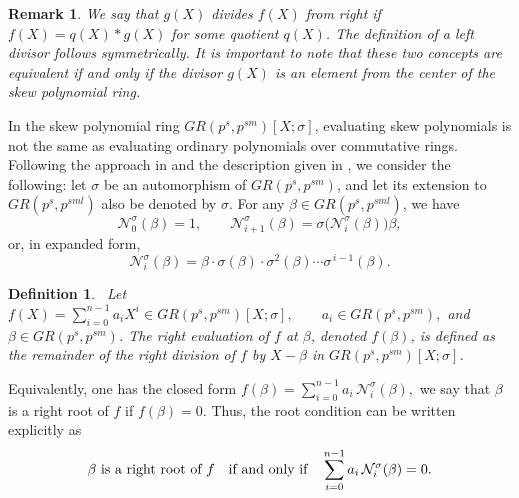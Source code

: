 \documentclass[11pt]{article}
\newtheorem{definition}{Definition}
\newtheorem{remark}{Remark}
\begin{document}
 \noindent 
 \begin{remark}
      We say that $g(X)$ divides  $f(X)$ from right if $
f(X) = q(X) \ast g(X)
$
for some quotient $q(X)$. The definition of a left divisor follows symmetrically. It is important to note that these two concepts are equivalent if and only if the divisor $g(X)$ is an element from the center of the skew polynomial ring.

 \end{remark}
 In the skew polynomial ring $GR(p^s,p^{sm})[X;\sigma]$, evaluating skew polynomials is not the same as evaluating ordinary polynomials over commutative rings. Following the approach in \cite{Bhaintwal2012Skew} and the description given in \cite[pp.~15]{Jacobson1996}, we consider the following: let $\sigma$ be an automorphism of $GR(p^s,p^{sm})$, and let its extension to $GR(p^s,p^{sml})$ also be denoted by $\sigma$.
 For any $\beta \in GR(p^s,p^{sml})$, we have
	\[
	\mathcal{N}^{\sigma}_0(\beta)=1,\qquad
	\mathcal{N}^{\sigma}_{i+1}(\beta)=\sigma\bigl(\mathcal{N}^{\sigma}_i(\beta)\bigr)\beta,
	\]
	or, in expanded form,
	\[
	\mathcal{N}^{\sigma}_i(\beta)=\beta\cdot\sigma(\beta)\cdot\sigma^2(\beta)\cdots\sigma^{\,i-1}(\beta).
	\]
\begin{definition}\
	Let
	\(
	f(X)=\sum_{i=0}^{n-1} a_i X^i \in GR(p^s,p^{sm})[X;\sigma], \qquad a_i\in GR(p^s,p^{sm}),
	\)
	and \( \beta\in GR(p^s,p^{sm}) \).	The right evaluation of \( f \) at \( \beta \), denoted \( f(\beta) \), is defined as the remainder of the right division of \( f \) by \( X-\beta \) in \( GR(p^s,p^{sm})[X;\sigma] \). 	
\end{definition}
Equivalently, one has the closed form
	\(
	f(\beta)=\sum_{i=0}^{n-1} a_i\,\mathcal{N}^{\sigma}_i(\beta),
	\) we say that \( \beta \) is a right root of \( f \) if \( f(\beta)=0 \). Thus, the root condition can be written explicitly as
	\begin{eqnarray}\label{EQN1}
		\beta\ \text{is a right root of } f \quad \textup{if and only if}\quad
		\sum_{i=0}^{n-1} a_i\,\mathcal{N}^{\sigma}_i(\beta)=0.
	\end{eqnarray}

\end{document}
